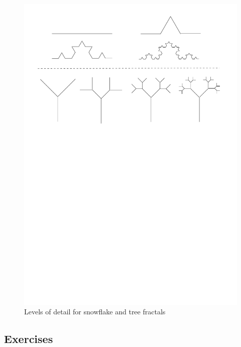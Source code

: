 \documentclass[12pt,a4paper,twoside]{article}
\renewcommand{\_}{\texttt{\symbol{95}}}
\begin{document}
\begin{figure}[t]
\centering
\includegraphics[scale=0.5,trim=10mm 170mm 10mm 10mm]{diagrams/compact}
\caption{Levels of detail for snowflake and tree fractals}
\label{fractal}
\end{figure}

\subsection{Exercises}
\end{document}

